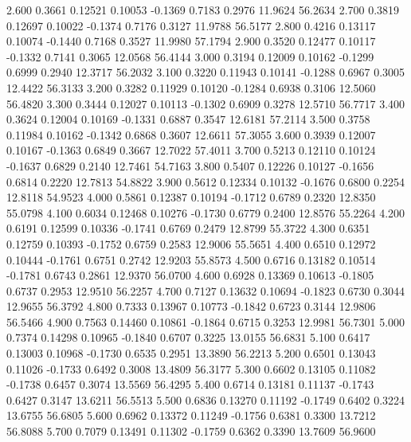    2.600   0.3661   0.12521   0.10053  -0.1369   0.7183   0.2976  11.9624  56.2634
   2.700   0.3819   0.12697   0.10022  -0.1374   0.7176   0.3127  11.9788  56.5177
   2.800   0.4216   0.13117   0.10074  -0.1440   0.7168   0.3527  11.9980  57.1794
   2.900   0.3520   0.12477   0.10117  -0.1332   0.7141   0.3065  12.0568  56.4144
   3.000   0.3194   0.12009   0.10162  -0.1299   0.6999   0.2940  12.3717  56.2032
   3.100   0.3220   0.11943   0.10141  -0.1288   0.6967   0.3005  12.4422  56.3133
   3.200   0.3282   0.11929   0.10120  -0.1284   0.6938   0.3106  12.5060  56.4820
   3.300   0.3444   0.12027   0.10113  -0.1302   0.6909   0.3278  12.5710  56.7717
   3.400   0.3624   0.12004   0.10169  -0.1331   0.6887   0.3547  12.6181  57.2114
   3.500   0.3758   0.11984   0.10162  -0.1342   0.6868   0.3607  12.6611  57.3055
   3.600   0.3939   0.12007   0.10167  -0.1363   0.6849   0.3667  12.7022  57.4011
   3.700   0.5213   0.12110   0.10124  -0.1637   0.6829   0.2140  12.7461  54.7163
   3.800   0.5407   0.12226   0.10127  -0.1656   0.6814   0.2220  12.7813  54.8822
   3.900   0.5612   0.12334   0.10132  -0.1676   0.6800   0.2254  12.8118  54.9523
   4.000   0.5861   0.12387   0.10194  -0.1712   0.6789   0.2320  12.8350  55.0798
   4.100   0.6034   0.12468   0.10276  -0.1730   0.6779   0.2400  12.8576  55.2264
   4.200   0.6191   0.12599   0.10336  -0.1741   0.6769   0.2479  12.8799  55.3722
   4.300   0.6351   0.12759   0.10393  -0.1752   0.6759   0.2583  12.9006  55.5651
   4.400   0.6510   0.12972   0.10444  -0.1761   0.6751   0.2742  12.9203  55.8573
   4.500   0.6716   0.13182   0.10514  -0.1781   0.6743   0.2861  12.9370  56.0700
   4.600   0.6928   0.13369   0.10613  -0.1805   0.6737   0.2953  12.9510  56.2257
   4.700   0.7127   0.13632   0.10694  -0.1823   0.6730   0.3044  12.9655  56.3792
   4.800   0.7333   0.13967   0.10773  -0.1842   0.6723   0.3144  12.9806  56.5466
   4.900   0.7563   0.14460   0.10861  -0.1864   0.6715   0.3253  12.9981  56.7301
   5.000   0.7374   0.14298   0.10965  -0.1840   0.6707   0.3225  13.0155  56.6831
   5.100   0.6417   0.13003   0.10968  -0.1730   0.6535   0.2951  13.3890  56.2213
   5.200   0.6501   0.13043   0.11026  -0.1733   0.6492   0.3008  13.4809  56.3177
   5.300   0.6602   0.13105   0.11082  -0.1738   0.6457   0.3074  13.5569  56.4295
   5.400   0.6714   0.13181   0.11137  -0.1743   0.6427   0.3147  13.6211  56.5513
   5.500   0.6836   0.13270   0.11192  -0.1749   0.6402   0.3224  13.6755  56.6805
   5.600   0.6962   0.13372   0.11249  -0.1756   0.6381   0.3300  13.7212  56.8088
   5.700   0.7079   0.13491   0.11302  -0.1759   0.6362   0.3390  13.7609  56.9600
